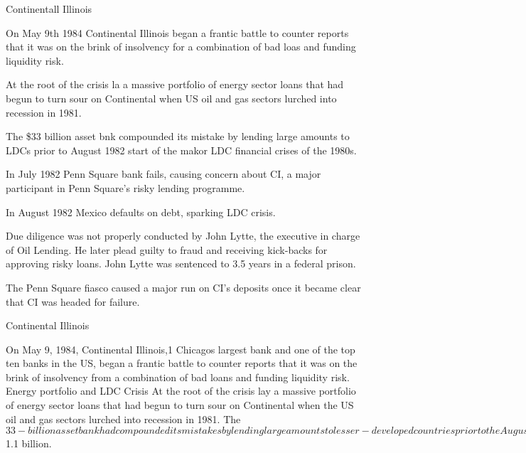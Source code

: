 Continentall Illinois

On May 9th 1984 Continental Illinois began a frantic battle to counter reports that 
it was on the brink of insolvency for a combination of bad loas and funding liquidity risk.

At the root of the crisis la a massive portfolio of energy sector loans that had begun to turn sour on Continental
when US oil and gas sectors lurched into recession in 1981.

The \$33 billion asset bnk compounded its mistake by lending large amounts to LDCs prior to August
1982 start of the makor LDC financial crises of the 1980s.

In July 1982 Penn Square bank fails, causing concern about CI, a major participant in Penn Square's risky lending
programme.

In August 1982 Mexico defaults on debt, sparking LDC crisis.

Due diligence was not properly conducted by John Lytte, the executive in charge of Oil Lending.
He later plead guilty to fraud and receiving kick-backs for approving risky loans.
John Lytte was sentenced to 3.5 years in a federal prison.

The Penn Square fiasco caused a major run on CI's deposits once it became clear that CI was headed for failure.

Continental Illinois

On May 9, 1984, Continental Illinois,1 Chicagos largest bank and one of the top ten banks in the US, began a frantic battle to counter reports that it was on the brink of insolvency from a combination of bad loans and funding liquidity risk.
Energy portfolio and LDC Crisis
At the root of the crisis lay a massive portfolio of energy sector loans that had begun to turn sour on Continental when the US oil and gas sectors lurched into recession in 1981. The $33-billion asset bank had compounded its mistakes by lending large amounts to lesser-developed countries prior to the August 1982 start of the major LDC crisis of the 1980s. 
Rumours / Loss of Public Confidence
With investors and creditors spooked by rumours that the bank might fail or be taken over, Continental was quickly shut out of its usual domestic and international wholesale funding markets. The sharp drop in confidence can lead counterparties in the wholesale markets to suddenly withdraw funding from a damaged bank, spinning the institution into a funding liquidity crisis.
Emergency Funding and Guarantee – “Too Big To Fail”
By May 17, regulatory agencies and the banking industry had arranged billions of dollars in emergency funding for the stricken giant. The Federal Deposit Insurance Corporation tried to stem the bleeding away of the banks funds by extending a guarantee to uninsured depositors and creditors at the bank giving credibility to the notion that some banks should be considered too big to fail. 
The emergency help was followed by a package of permanent measures, making Continental the largest bank in the history of US banking ever to be rescued by government agencies. 
The FDICs share of the bill was later calculated to be $1.1 billion.		 

